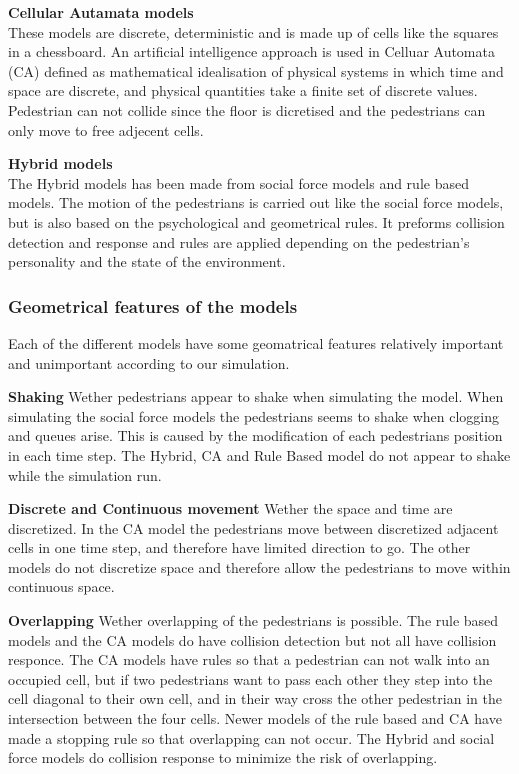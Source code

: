 \textbf{Cellular Autamata models}\\
These models are discrete, deterministic and is made up of cells like the squares in a chessboard.
An artificial intelligence approach is used in Celluar Automata (CA) defined as mathematical idealisation 
of physical systems in which time and space are discrete, and physical quantities take a finite set of 
discrete values. Pedestrian can not collide since the floor is dicretised and the pedestrians can
only move to free adjecent cells.\cite{Comparison}

\textbf{Hybrid models}\\
The Hybrid models has been made from social force models and rule based models. 
The motion of the pedestrians is carried out like the social force models, but is also based 
on the psychological and geometrical rules. It preforms collision detection and response and rules 
are applied depending on the pedestrian's personality and the state of the environment. 
\cite{Comparison}
\\

\subsubsection{Geometrical features of the models}
Each of the different models have some geomatrical features relatively important and 
unimportant according to our simulation.

\textbf{Shaking} Wether pedestrians appear to shake when simulating the model. When 
simulating the social force models the pedestrians seems to shake when clogging and 
queues arise. This is caused by the modification of each pedestrians position in each 
time step. The Hybrid, CA and Rule Based model do not appear to shake while the simulation run.

\textbf{Discrete and Continuous movement} Wether the space and time are discretized. 
In the CA model the pedestrians move between discretized adjacent cells in one time step, 
and therefore have limited direction to go. The other models do not discretize space and 
therefore allow the pedestrians to move within continuous space.
 
\textbf{Overlapping} Wether overlapping of the pedestrians is possible. The rule 
based models and the CA models do have collision detection but not all have collision 
responce. The CA models have rules so that a pedestrian can not walk into an occupied 
cell, but if two pedestrians want to pass each other they step into the cell diagonal 
to their own cell, and in their way cross the other pedestrian in the intersection 
between the four cells. Newer models of the rule based and CA have made a stopping 
rule so that overlapping can not occur. The Hybrid and social force models do collision 
response to minimize the risk of overlapping. \cite{Comparison}

